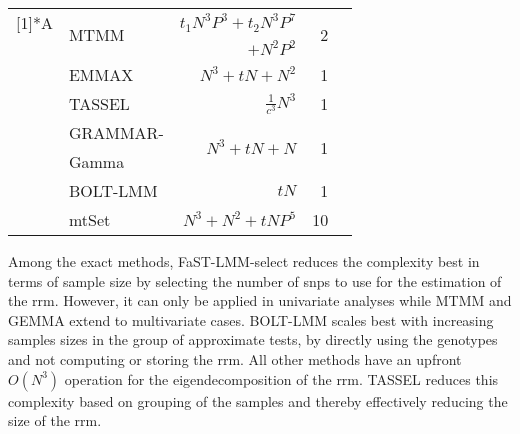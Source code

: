 \begin{table}[h]
\begin{small}
\begin{tabular}{llrrr}
    \addlinespace[3ex]
    \multirow{9}[1]{*}{A} & \multicolumn{1}{l}{\multirow{2}[0]{*}{MTMM}}  & \(t_1N^3P^3 + t_2N^3P^7 \) &  \multirow{2}[0]{*}{\num{2}} &  \multirow{2}[0]{*}{\citep{Korte2012}}\footnotemark[2] \\
                    \addlinespace[-.2ex]
          &  & \(+ N^2P^2\) & & \\
    		& EMMAX & \(N^3 + tN + N^2\) & \num{1} & \citep{Kang2010} \\
          & TASSEL & \(\frac{1}{c^3}N^3\) & \num{1} & \citep{Zhang2010} \\
          & GRAMMAR- & \multirow{2}[0]{*}{\(N^3 + tN + N\)} & \multirow{2}[0]{*}{\num{1}} & \multicolumn{1}{r}{\multirow{2}[0]{*}{\citep{Svishcheva2012}}} \\
          \addlinespace[-.5ex]
          & Gamma &       &       &  \\
          & BOLT-LMM & \(tN\) & \num{1} & \citep{Loh2014} \\
          & mtSet & \(N^3 + N^2 + tNP^5\) & \num{10} & \citep{Casale2015} \\
    \bottomrule
    \end{tabular}
  \end{small}
  \label{tab:lmmframeworks}%
\end{table}%
%
Among the exact methods, FaST-LMM-select reduces the complexity best in terms of sample size by selecting the number of \glspl{snp} to use for the estimation of the \gls{rrm}.  However, it can only be applied in univariate analyses while MTMM and GEMMA extend to multivariate cases.  BOLT-LMM scales best with increasing samples sizes in the group of approximate tests, by directly using the genotypes and not computing or storing the \gls{rrm}. All other methods have an upfront \(O(N^3)\) operation for the eigendecomposition of the \gls{rrm}. TASSEL reduces this complexity based on grouping of the samples and thereby effectively reducing the size of the \gls{rrm}.

